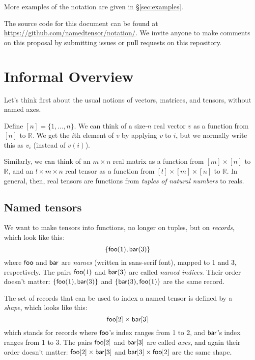 \documentclass{article}
\begin{document}
More examples of the notation are given in \S\ref{sec:examples}.

The source code for this document can be found at \url{https://github.com/namedtensor/notation/}. We invite anyone to make comments on this proposal by submitting issues or pull requests on this repository.

\section{Informal Overview}
\label{sec:intro}

Let's think first about the usual notions of vectors, matrices, and tensors, without named axes.

Define $[n] = \{1, \ldots, n\}$. We can think of a size-$n$ real vector $v$ as a function from $[n]$ to $\mathbb{R}$. We get the $i$th element of $v$ by applying $v$ to $i$, but we normally write this as $v_i$ (instead of $v(i)$). 

Similarly, we can think of an $m \times n$ real matrix as a function from $[m] \times [n]$ to $\mathbb{R}$, and an $l \times m \times n$ real tensor as a function from $[l] \times [m] \times [n]$ to $\mathbb{R}$. In general, then, real tensors are functions from \emph{tuples of natural numbers} to reals.

\subsection{Named tensors}

We want to make tensors into functions, no longer on tuples, but on \emph{records}, which look like this: \[\{\mathsf{foo}(1), \mathsf{bar}(3)\}\] where $\mathsf{foo}$ and $\mathsf{bar}$ are \emph{names} (written in sans-serif font), mapped to 1 and 3, respectively. The pairs $\mathsf{foo}(1)$ and $\mathsf{bar}(3)$ are called \emph{named indices}. Their order doesn't matter: $\{\mathsf{foo}(1), \mathsf{bar}(3)\}$ and $\{\mathsf{bar}(3), \mathsf{foo}(1)\}$ are the same record.

The set of records that can be used to index a named tensor is defined by a \emph{shape}, which looks like this: \[\mathsf{foo}[2] \times \mathsf{bar}[3]\] which stands for records where $\mathsf{foo}$'s index ranges from 1 to 2, and $\mathsf{bar}$'s index ranges from 1 to 3. The pairs $\mathsf{foo}[2]$ and $\mathsf{bar}[3]$ are called \emph{axes}, and again their order doesn't matter: $\mathsf{foo}[2] \times \mathsf{bar}[3]$ and $\mathsf{bar}[3] \times \mathsf{foo}[2]$ are the same shape.
\end{document}
